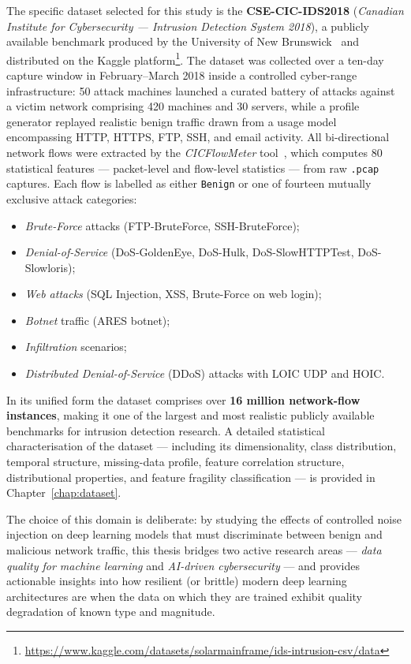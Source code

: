 The specific dataset selected for this study is the \textbf{CSE-CIC-IDS2018}
(\emph{Canadian Institute for Cybersecurity — Intrusion Detection System 2018}),
a publicly available benchmark produced by the University of New
Brunswick~\cite{cicids2018} and distributed on the Kaggle
platform\footnote{\url{https://www.kaggle.com/datasets/solarmainframe/ids-intrusion-csv/data}}.
The dataset was collected over a ten-day capture window in February--March 2018
inside a controlled cyber-range infrastructure: 50 attack machines launched a
curated battery of attacks against a victim network comprising 420 machines and
30 servers, while a profile generator replayed realistic benign traffic drawn
from a usage model encompassing HTTP, HTTPS, FTP, SSH, and email activity.
All bi-directional network flows were extracted by the \textit{CICFlowMeter}
tool~\cite{lashkari2017characterization}, which computes 80 statistical features
— packet-level and flow-level statistics — from raw \texttt{.pcap} captures.
Each flow is labelled as either \texttt{Benign} or one of fourteen mutually
exclusive attack categories:

\begin{itemize}
    \item \emph{Brute-Force} attacks (FTP-BruteForce, SSH-BruteForce);
    \item \emph{Denial-of-Service} (DoS-GoldenEye, DoS-Hulk,
          DoS-SlowHTTPTest, DoS-Slowloris);
    \item \emph{Web attacks} (SQL Injection, XSS, Brute-Force on web login);
    \item \emph{Botnet} traffic (ARES botnet);
    \item \emph{Infiltration} scenarios;
    \item \emph{Distributed Denial-of-Service} (DDoS) attacks with LOIC
          UDP and HOIC.
\end{itemize}

In its unified form the dataset comprises over \textbf{16 million network-flow
instances}, making it one of the largest and most realistic publicly available
benchmarks for intrusion detection research.  A detailed statistical
characterisation of the dataset — including its dimensionality, class
distribution, temporal structure, missing-data profile, feature correlation
structure, distributional properties, and feature fragility classification — is
provided in Chapter~\ref{chap:dataset}.

The choice of this domain is deliberate: by studying the effects of controlled
noise injection on deep learning models that must discriminate between benign
and malicious network traffic, this thesis bridges two active research areas —
\emph{data quality for machine learning} and \emph{AI-driven cybersecurity} —
and provides actionable insights into how resilient (or brittle) modern deep
learning architectures are when the data on which they are trained exhibit
quality degradation of known type and magnitude.

